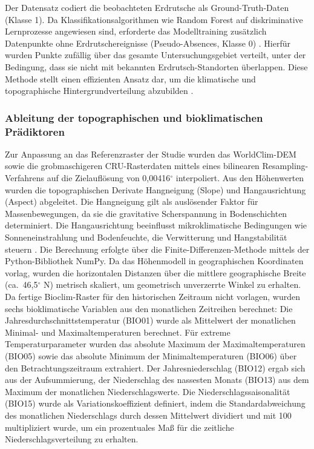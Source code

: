 \documentclass[../main.tex]{subfiles}
\begin{document}
Der Datensatz codiert die beobachteten Erdrutsche als Ground-Truth-Daten (Klasse 1).
Da Klassifikationsalgorithmen wie Random Forest auf diskriminative Lernprozesse angewiesen sind, erforderte das Modelltraining zusätzlich Datenpunkte ohne Erdrutschereignisse (Pseudo-Absences, Klasse 0) \autocite{jiangImpactNonLandslideSample2025}.
Hierfür wurden Punkte zufällig über das gesamte Untersuchungsgebiet verteilt, unter der Bedingung, dass sie nicht mit bekannten Erdrutsch-Standorten überlappen.
Diese Methode stellt einen effizienten Ansatz dar, um die klimatische und topographische Hintergrundverteilung abzubilden \autocite{jiangImpactNonLandslideSample2025}.

\subsubsection{Ableitung der topographischen und bioklimatischen Prädiktoren}
Zur Anpassung an das Referenzraster der Studie wurden das WorldClim-DEM sowie die grobmaschigeren CRU-Rasterdaten mittels eines bilinearen Resampling-Verfahrens auf die Zielauflösung von 0,00416$^{\circ}$ interpoliert.
Aus den Höhenwerten wurden die topographischen Derivate Hangneigung (Slope) und Hangausrichtung (Aspect) abgeleitet.
Die Hangneigung gilt als auslösender Faktor für Massenbewegungen, da sie die gravitative Scherspannung in Bodenschichten determiniert.
Die Hangausrichtung beeinflusst mikroklimatische Bedingungen wie Sonneneinstrahlung und Bodenfeuchte, die Verwitterung und Hangstabilität steuern \autocite{dhakalEnhancingLandslideDisaster2025}.
Die Berechnung erfolgte über die Finite-Differenzen-Methode mittels der Python-Bibliothek NumPy.
Da das Höhenmodell in geographischen Koordinaten vorlag, wurden die horizontalen Distanzen über die mittlere geographische Breite (ca.\ 46,5$^{\circ}$ N) metrisch skaliert, um geometrisch unverzerrte Winkel zu erhalten.
Da fertige Bioclim-Raster für den historischen Zeitraum nicht vorlagen, wurden sechs bioklimatische Variablen aus den monatlichen Zeitreihen berechnet: Die Jahresdurchschnittstemperatur (BIO01) wurde als Mittelwert der monatlichen Minimal- und Maximaltemperaturen berechnet.
Für extreme Temperaturparameter wurden das absolute Maximum der Maximaltemperaturen (BIO05) sowie das absolute Minimum der Minimaltemperaturen (BIO06) über den Betrachtungszeitraum extrahiert.
Der Jahresniederschlag (BIO12) ergab sich aus der Aufsummierung, der Niederschlag des nassesten Monats (BIO13) aus dem Maximum der monatlichen Niederschlagswerte.
Die Niederschlagssaisonalität (BIO15) wurde als Variationskoeffizient definiert, indem die Standardabweichung des monatlichen Niederschlags durch dessen Mittelwert dividiert und mit 100 multipliziert wurde, um ein prozentuales Maß für die zeitliche Niederschlagsverteilung zu erhalten.
\end{document}
